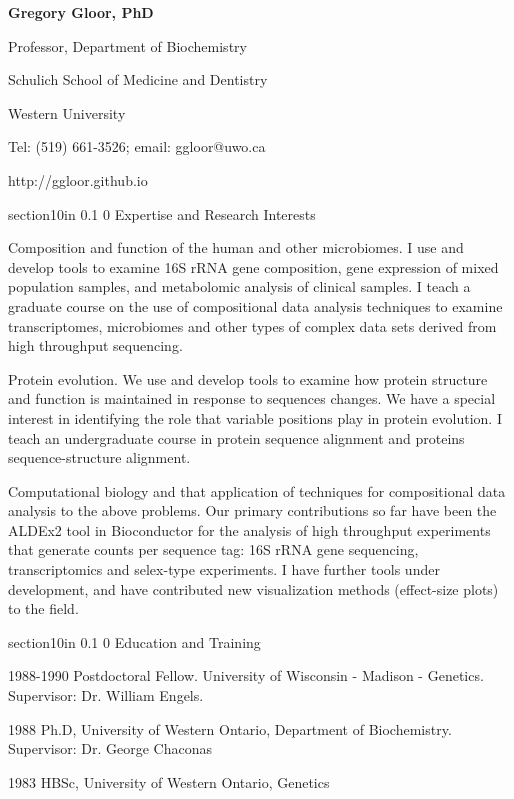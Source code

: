 \documentclass[11pt]{article}
\makeatletter
\renewcommand\section{\@startsection
	{section}{1}{0in}%
	{0.1\baselineskip}%
	{0\baselineskip}%
	{\sffamily\bfseries\large}
}
\makeatother
\begin{document}
\begin{center}
\textbf{Gregory Gloor, PhD}

Professor, Department of Biochemistry

Schulich School of Medicine and Dentistry

Western University

Tel: (519) 661-3526; email: ggloor@uwo.ca 
 
http://ggloor.github.io
\end{center}
\section{Expertise and Research Interests}
\begin{description}\itemsep=-2pt
\item Composition and function of the human and other microbiomes. I use and develop tools to examine 16S rRNA gene composition, gene expression of mixed population samples, and metabolomic analysis of clinical samples. I teach a graduate course on the use of compositional data analysis techniques to examine transcriptomes, microbiomes and other types of complex data sets derived from high throughput sequencing. 
\item Protein evolution. We use and develop tools to examine how protein structure and function is maintained in response to sequences changes. We have a special interest in identifying the role that variable positions play in protein evolution. I teach an undergraduate course in protein sequence alignment and proteins sequence-structure alignment. 
\item Computational biology and that application of techniques for compositional data analysis to the above problems. Our primary contributions so far have been the ALDEx2 tool in Bioconductor for the analysis of high throughput experiments that generate counts per sequence tag: 16S rRNA gene sequencing, transcriptomics and selex-type experiments. I have further tools under development, and have contributed new visualization methods (effect-size plots) to the field.
\end{description}

\section{Education and Training}
\begin{description}\itemsep=-2pt
\item 1988-1990  Postdoctoral Fellow.  University of Wisconsin - Madison - Genetics. Supervisor: Dr. William Engels.
\item 1988  Ph.D, University of Western Ontario, Department of Biochemistry. Supervisor: Dr. George Chaconas
\item 1983  HBSc, University of Western Ontario, Genetics
\end{description}
\end{document}
